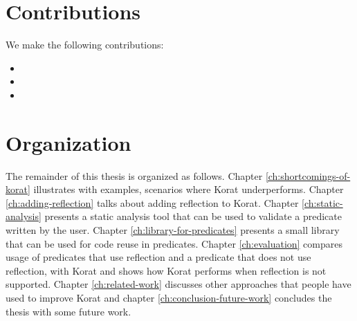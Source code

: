 \section{Contributions}
\label{sec:contributions}
We make the following contributions:

\begin{itemize}
\item 
\item 
\item 
\end{itemize}

\section{Organization}
\label{sec:organization-of-thesis}
The remainder of this thesis is organized as follows. Chapter \ref{ch:shortcomings-of-korat} illustrates with examples, scenarios where Korat underperforms. Chapter \ref{ch:adding-reflection} talks about adding reflection to Korat. Chapter \ref{ch:static-analysis} presents a static analysis tool that can be used to validate a predicate written by the user. Chapter \ref{ch:library-for-predicates} presents a small library that can be used for code reuse in predicates. Chapter \ref{ch:evaluation} compares usage of predicates that use reflection and a predicate that does not use reflection, with Korat and shows how Korat performs when reflection is not supported. Chapter \ref{ch:related-work} discusses other approaches that people have used to improve Korat and chapter \ref{ch:conclusion-future-work} concludes the thesis with some future work.
